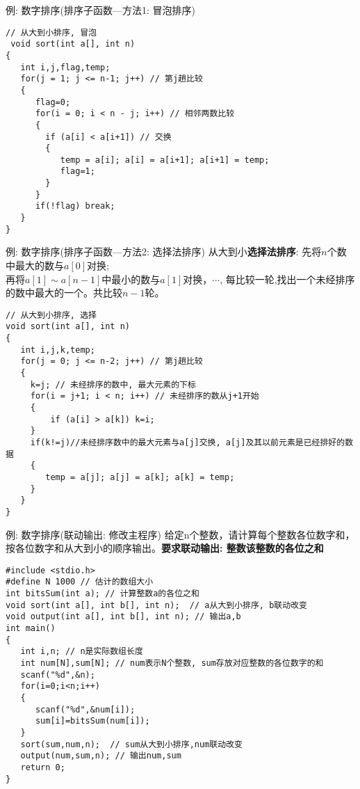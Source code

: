 \begin{frame}{例: 数字排序(排序子函数---方法1: 冒泡排序)}
\begin{lstlisting}
// 从大到小排序, 冒泡
 void sort(int a[], int n)
{
   int i,j,flag,temp;
   for(j = 1; j <= n-1; j++) // 第j趟比较
   {
      flag=0;
      for(i = 0; i < n - j; i++) // 相邻两数比较
      {
        if (a[i] < a[i+1]) // 交换
        { 
           temp = a[i]; a[i] = a[i+1]; a[i+1] = temp; 
           flag=1;
        }
      }
      if(!flag) break;
   }
}
\end{lstlisting}
\end{frame}

\begin{frame}{例: 数字排序(排序子函数---方法2: 选择法排序)}
从大到小\textbf{选择法排序}: 先将$n$个数中最大的数与$a[0]$对换;\\
再将$a[1]\sim a[n-1]中最小的数与a[1]$对换，$\cdots$, 每比较一轮,找出一个未经排序的数中最大的一个。共比较$n-1$轮。
\begin{lstlisting}
// 从大到小排序, 选择
void sort(int a[], int n)
{
   int i,j,k,temp;
   for(j = 0; j <= n-2; j++) // 第j趟比较
   {
     k=j; // 未经排序的数中, 最大元素的下标
     for(i = j+1; i < n; i++) // 未经排序的数从j+1开始
     {
         if (a[i] > a[k]) k=i;
     }
     if(k!=j)//未经排序数中的最大元素与a[j]交换, a[j]及其以前元素是已经排好的数据
     { 
        temp = a[j]; a[j] = a[k]; a[k] = temp; 
     }
   }
}
\end{lstlisting}
\end{frame}

\begin{frame}{例: 数字排序(联动输出: 修改主程序)}
给定n个整数，请计算每个整数各位数字和，按各位数字和从大到小的顺序输出。\textbf{要求联动输出: 整数\quad 该整数的各位之和}
\begin{lstlisting}
#include <stdio.h>
#define N 1000 // 估计的数组大小
int bitsSum(int a); // 计算整数a的各位之和
void sort(int a[], int b[], int n);  // a从大到小排序, b联动改变
void output(int a[], int b[], int n); // 输出a,b
int main()
{
   int i,n; // n是实际数组长度 
   int num[N],sum[N]; // num表示N个整数, sum存放对应整数的各位数字的和  
   scanf("%d",&n);
   for(i=0;i<n;i++) 
   {
      scanf("%d",&num[i]); 
      sum[i]=bitsSum(num[i]);
   }
   sort(sum,num,n);  // sum从大到小排序,num联动改变
   output(num,sum,n); // 输出num,sum
   return 0;
}
\end{lstlisting}
\end{frame}

